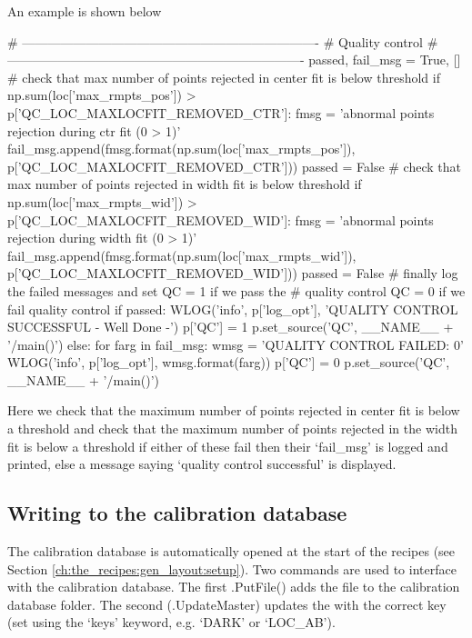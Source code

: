 \vspace{0.5cm}
\begin{minipage}{\textwidth}
\noindent An example is shown below
\begin{pythonbox}
# ----------------------------------------------------------------------
# Quality control
# ----------------------------------------------------------------------
passed, fail_msg = True, []
# check that max number of points rejected in center fit is below threshold
if np.sum(loc['max_rmpts_pos']) > p['QC_LOC_MAXLOCFIT_REMOVED_CTR']:
    fmsg = 'abnormal points rejection during ctr fit ({0} > {1})'
    fail_msg.append(fmsg.format(np.sum(loc['max_rmpts_pos']),
                                p['QC_LOC_MAXLOCFIT_REMOVED_CTR']))
    passed = False
# check that max number of points rejected in width fit is below threshold
if np.sum(loc['max_rmpts_wid']) > p['QC_LOC_MAXLOCFIT_REMOVED_WID']:
    fmsg = 'abnormal points rejection during width fit ({0} > {1})'
    fail_msg.append(fmsg.format(np.sum(loc['max_rmpts_wid']),
                                p['QC_LOC_MAXLOCFIT_REMOVED_WID']))
    passed = False
# finally log the failed messages and set QC = 1 if we pass the
# quality control QC = 0 if we fail quality control
if passed:
    WLOG('info', p['log_opt'], 'QUALITY CONTROL SUCCESSFUL - Well Done -')
    p['QC'] = 1
    p.set_source('QC', __NAME__ + '/main()')
else:
    for farg in fail_msg:
        wmsg = 'QUALITY CONTROL FAILED: {0}'
        WLOG('info', p['log_opt'], wmsg.format(farg))
    p['QC'] = 0
    p.set_source('QC', __NAME__ + '/main()')
\end{pythonbox}
\begin{note}
Here we check that the maximum number of points rejected in center fit is below a threshold and check that the maximum number of points rejected in the width fit is below a threshold if either of these fail then their `fail\_msg' is logged and printed, else a message saying `quality control successful' is displayed.
\end{note}
\end{minipage}

\clearpage
\newpage
\subsection{Writing to the calibration database}
\label{ch:the_recipes:gen_layout:writing_calibdb}

The calibration database is automatically opened at the start of the recipes (see Section \ref{ch:the_recipes:gen_layout:setup}). Two commands are used to interface with the calibration database. The first \spirouCDB.PutFile() adds the file to the calibration database folder. The second (\spirouCDB.UpdateMaster) updates the \masterCALIBDBfile with the correct key (set using the `keys' keyword, e.g. `DARK' or `LOC\_AB').


